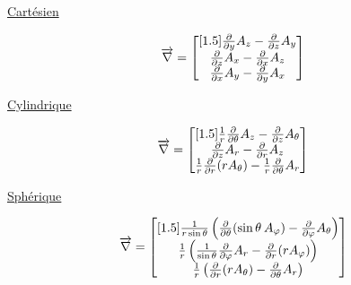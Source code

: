\documentclass{article}
\newcommand{\vtab} {\vspace{0.4cm}}
\begin{document}
\begin{center}
\begin{multicols}{3}
		{\Large \underline{Cartésien}} \\
\vtab

			$$\scalebox{1}{$\displaystyle \overrightarrow{\nabla} = \begin{bmatrix}[1.5] \frac{\partial}{\partial y} A_z - \frac{\partial}{\partial z} A_y \\ \frac{\partial}{\partial z} A_x - \frac{\partial}{\partial x} A_z \\ \frac{\partial}{\partial x} A_y - \frac{\partial}{\partial y} A_x \end{bmatrix}$}$$

	\columnbreak
		{\Large \underline{Cylindrique}} \\

\vtab

			$$\scalebox{1}{$\displaystyle \overrightarrow{\nabla} = \begin{bmatrix}[1.5] \frac{1}{r} \frac{\partial}{\partial \theta} A_{z} - \frac{\partial}{\partial z}  A_{\theta} \\ \frac{\partial}{\partial z} A_r - \frac{\partial}{\partial r} A_z \\ \frac{1}{r} \frac{\partial}{\partial r} (r A_{\theta}) - \frac{1}{r} \frac{\partial}{\partial \theta} A_r \end{bmatrix}$}$$

	
	\columnbreak
		{\Large \underline{Sphérique}} \\

\vtab

			$$\scalebox{1}{$\displaystyle \overrightarrow{\nabla} = \begin{bmatrix}[1.5] \frac{1}{r \sin \theta} \left( \frac{\partial}{\partial \theta} (\sin \theta \hspace{2px} A_{\varphi}) - \frac{\partial}{\partial \varphi}  A_{\theta} \right) \\ \frac{1}{r} \left( \frac{1}{\sin \theta}\frac{\partial}{\partial \varphi} A_r - \frac{\partial}{\partial r} (rA_{\varphi}) \right) \\ \frac{1}{r} \left( \frac{\partial}{\partial r} (r A_{\theta}) - \frac{\partial}{\partial \theta} A_r \right) \end{bmatrix}$}$$

\end{multicols}
\end{center}

\vtab
\vtab
\end{document}
